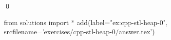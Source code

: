 
\begin{ex} 
  \label{ex:cpp-stl-heap-0}
  
  \qed
\end{ex} 
\begin{python0}
from solutions import *
add(label="ex:cpp-stl-heap-0",
    srcfilename='exercises/cpp-stl-heap-0/answer.tex') 
\end{python0}
